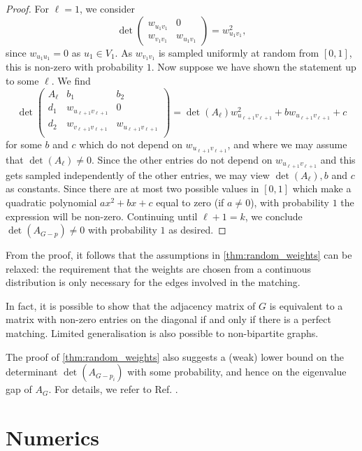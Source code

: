 \begin{proof}
For $\ell =1$, we consider \[
\det\begin{pmatrix} w_{u_1v_1} & 0\\w_{v_1v_1}&w_{u_1v_1}\end{pmatrix}=w_{u_1v_1}^2,
\]
since $w_{u_1u_1}=0$ as $u_1\in V_1$. As  $w_{v_1v_1}$ is sampled uniformly at random  from $[0,1]$, this is non-zero with probability $1$. Now suppose we have shown the statement up to some $\ell$. We find
\[
\det\begin{pmatrix}A_\ell & b_1 & b_2\\
d_1 & w_{u_{\ell+1}v_{\ell+1}}&0 \\
d_2 & w_{v_{\ell+1}v_{\ell+1}}& w_{u_{\ell+1}v_{\ell+1}}\\
\end{pmatrix}=\det(A_\ell)w_{u_{\ell+1}v_{\ell+1}}^2 + b w_{u_{\ell+1}v_{\ell+1}} + c
\]
for some $b$ and $c$ which do not depend on $w_{u_{\ell+1}v_{\ell+1}}$, and where we may assume that $\det(A_\ell)\neq 0$. Since the other entries do not depend on $w_{u_{\ell+1}v_{\ell+1}}$ and this gets sampled independently of the other entries, we may view $\det(A_\ell),b$ and $c$ as constants. Since there are at most two possible values in $[0,1]$ which make a quadratic polynomial $ax^2+bx+c$ equal to zero (if $a\neq 0$), with probability $1$ the expression will be non-zero. Continuing until $\ell+1=k$, we conclude $\det(A_{G-p})\neq 0$ with probability $1$ as desired.
\end{proof}
\begin{remark}
\label{rem:generalisation_random_weights}
From the proof, it follows that the assumptions in \cref{thm:random_weights} can be relaxed: the requirement that the weights are chosen from a continuous distribution is only necessary for the edges involved in the matching. 

In fact, it is possible to show that the adjacency matrix of $G$ is equivalent to a matrix with non-zero entries on the diagonal if and only if there is a perfect matching. Limited generalisation is also possible to non-bipartite graphs. 
\end{remark}

The proof of \cref{thm:random_weights} also suggests a (weak) lower bound on the determinant $\det(A_{G-p_i})$ with some probability, and hence on the eigenvalue gap of $A_G$. For details, we refer to Ref. \cite{Groenland2019b}. 

\section{Numerics}
\label{sec:CTAPnumerics}

